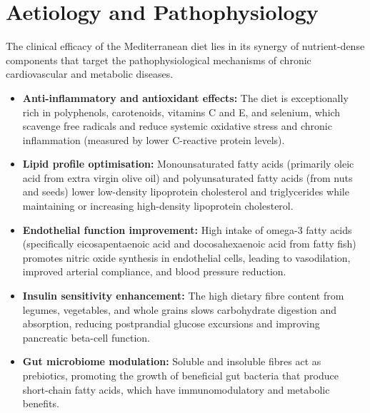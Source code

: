 \section*{Aetiology and Pathophysiology}
The clinical efficacy of the Mediterranean diet lies in its synergy of nutrient-dense components that target the pathophysiological mechanisms of chronic cardiovascular and metabolic diseases.
\begin{itemize}
    \item \textbf{Anti-inflammatory and antioxidant effects:} The diet is exceptionally rich in polyphenols, carotenoids, vitamins C and E, and selenium, which scavenge free radicals and reduce systemic oxidative stress and chronic inflammation (measured by lower C-reactive protein levels).
    \item \textbf{Lipid profile optimisation:} Monounsaturated fatty acids (primarily oleic acid from extra virgin olive oil) and polyunsaturated fatty acids (from nuts and seeds) lower low-density lipoprotein cholesterol and triglycerides while maintaining or increasing high-density lipoprotein cholesterol.
    \item \textbf{Endothelial function improvement:} High intake of omega-3 fatty acids (specifically eicosapentaenoic acid and docosahexaenoic acid from fatty fish) promotes nitric oxide synthesis in endothelial cells, leading to vasodilation, improved arterial compliance, and blood pressure reduction.
    \item \textbf{Insulin sensitivity enhancement:} The high dietary fibre content from legumes, vegetables, and whole grains slows carbohydrate digestion and absorption, reducing postprandial glucose excursions and improving pancreatic beta-cell function.
    \item \textbf{Gut microbiome modulation:} Soluble and insoluble fibres act as prebiotics, promoting the growth of beneficial gut bacteria that produce short-chain fatty acids, which have immunomodulatory and metabolic benefits.
\end{itemize}

